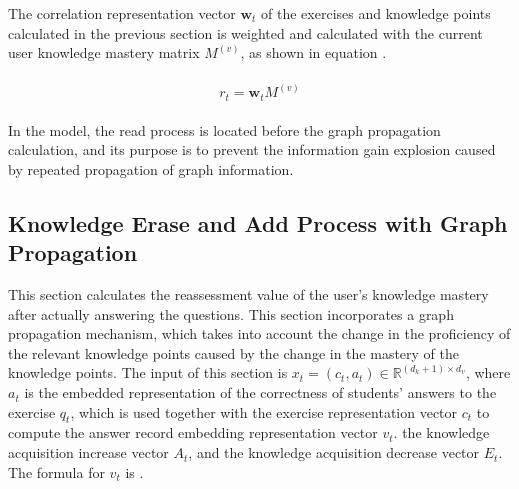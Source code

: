 The correlation representation vector \(\mathbf{w}_t\) of the exercises and knowledge points calculated in the previous section is weighted and calculated with the current user knowledge mastery matrix \(M^{(v)}\), as shown in equation \eqname{\ref{fml:ch3-read}}.

\begin{align}\label{fml:ch3-read}
    \begin{split}
        r_t=\mathbf{w}_t M^{(v)}
    \end{split}
\end{align}


In the model, the read process is located before the graph propagation calculation, and its purpose is to prevent the information gain explosion caused by repeated propagation of graph information.

\subsection{Knowledge Erase and Add Process with Graph Propagation}
This section calculates the reassessment value of the user's knowledge mastery after actually answering the questions. This section incorporates a graph propagation mechanism, which takes into account the change in the proficiency of the relevant knowledge points caused by the change in the mastery of the knowledge points. The input of this section is \(x_t=(c_t,a_t)\in\mathbb{R}^{(d_k+1)\times d_v} \), where \(a_t\) is the embedded representation of the correctness of students' answers to the exercise \(q_t\), which is used together with the exercise representation vector \(c_t\) to compute the answer record embedding representation vector \(v_t\). the knowledge acquisition increase vector \(A_t\), and the knowledge acquisition decrease vector \(E_t\). The formula for \(v_t\) is \eqname{\ref{fml:ch3-write-vt}}.

